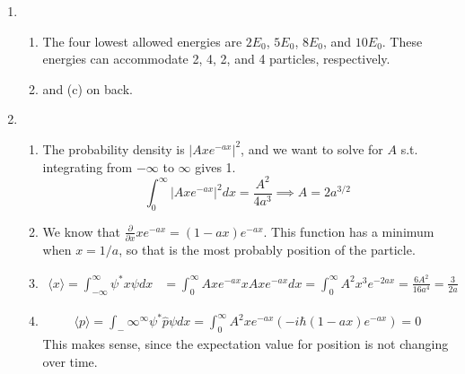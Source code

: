 \documentclass[10pt]{article}
\begin{document}
\begin{enumerate}
    \item \begin{enumerate}
        \item The four lowest allowed energies are $2E_0$, $5E_0$, $8E_0$, and $10E_0$. These energies can accommodate 2, 4, 2, and 4 particles, respectively.
        \item and (c) on back.
    \end{enumerate}

    \item \begin{enumerate}
        \item The probability density is $|Axe^{-ax}|^2$, and we want to solve for $A$ s.t. integrating from $-\infty$ to $\infty$ gives 1.
        \begin{equation*}
            \int_{0}^{\infty} \left|A x e^{-a x}\right|^2 dx = \frac{A^2}{4a^3} \implies
            A = 2a^{3/2}
        \end{equation*}

        \item We know that $\frac{\partial}{\partial x} x e^{-ax} = (1-ax)e^{-ax}$. This function has a minimum when $x = 1/a$, so that is the most probably position of the particle.

        \item
        \begin{align*}
            \langle x \rangle = \int_{-\infty}^{\infty} \psi^* x \psi dx &= \int_0^{\infty} Axe^{-ax}xAxe^{-ax}dx =
            \int_0^\infty A^2 x^3 e^{-2ax} = \frac{6A^2}{16a^4} = \frac{3}{2a}
        \end{align*}
        \item
        \begin{align*}
            \langle p \rangle = \int_-\infty^\infty \psi^* \hat{p} \psi dx =
            \int_0^\infty A^2xe^{-ax}(-i\hbar (1-ax) e^{-ax}) = 0
        \end{align*}
        This makes sense, since the expectation value for position is not changing over time.
    \end{enumerate}
  \end{enumerate}
\end{document}
